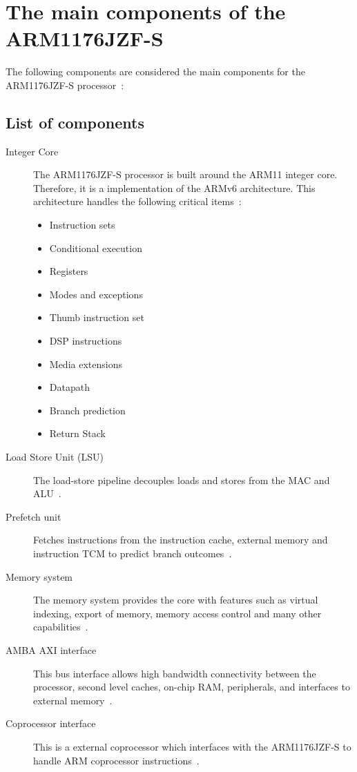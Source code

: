\documentclass[11pt]{report}
\begin{document}
\section{The main components of the ARM1176JZF-S}
\begin{doublespace}
The following components are considered the main components for the ARM1176JZF-S processor~\citep[1-8]{arm1176jzf-s}:
\subsection{List of components}
\end{doublespace}
\begin{description}
\item[Integer Core] The ARM1176JZF-S processor is built around the ARM11 integer core. Therefore, it is a implementation of the ARMv6 architecture. This architecture handles the following critical items~\citep[1-9]{arm1176jzf-s}:
\begin{itemize}
\item Instruction sets
\item Conditional execution
\item Registers
\item Modes and exceptions
\item Thumb instruction set
\item DSP instructions
\item Media extensions
\item Datapath
\item Branch prediction
\item Return Stack
\end{itemize}
\item[Load Store Unit (LSU)] The load-store pipeline decouples loads and stores from the MAC and ALU~\citep[1-11]{arm1176jzf-s}.
\item [Prefetch unit] Fetches instructions from the instruction cache, external memory and instruction TCM to predict branch outcomes~\citep[1-11]{arm1176jzf-s}.
\item [Memory system] The memory system provides the core with features such as virtual indexing, export of memory, memory access control and many other capabilities~\citep[1-12]{arm1176jzf-s}.
\item [AMBA AXI interface] This bus interface allows high bandwidth connectivity between the processor, second level caches, on-chip RAM, peripherals, and interfaces to external memory~\citep[1-16]{arm1176jzf-s}. 
\item [Coprocessor interface] This is a external coprocessor which interfaces with the ARM1176JZF-S to handle ARM coprocessor instructions~\citep[1-17]{arm1176jzf-s}.

\end{description}
\end{document}
